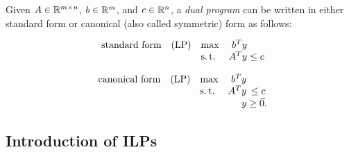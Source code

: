 \begin{defn}
    \label{defn:dual-program}
    Given $A \in \mathbb R^{m \times n}$, $b \in \mathbb R^m$, and $c \in \mathbb R^n$, a \textit{dual program} can be written in either standard form or canonical (also called symmetric) form as follows:
    \begin{multicols}{2}
    \noindent\begin{equation*}
    \begin{array}{lllr@{}c@{}r@{}l}
    \text{standard form} 
        & \text{(LP)}   & \max  & b^T y &           \\
        &               & \st   & A^T y & {}\le c   \\
    \end{array}
    \end{equation*}
    
    \noindent\begin{equation*}
    \begin{array}{lllr@{}c@{}r@{}l}
    \text{canonical form} 
        & \text{(LP)}   & \max  & b^T y &           \\
        &               & \st   & A^T y & {}\le c   \\
        &               &       &  y    & {}\ge \Vec{0}.
    \end{array}
    \end{equation*}
    \end{multicols}
\subsection{Introduction of ILPs}
\end{defn}

